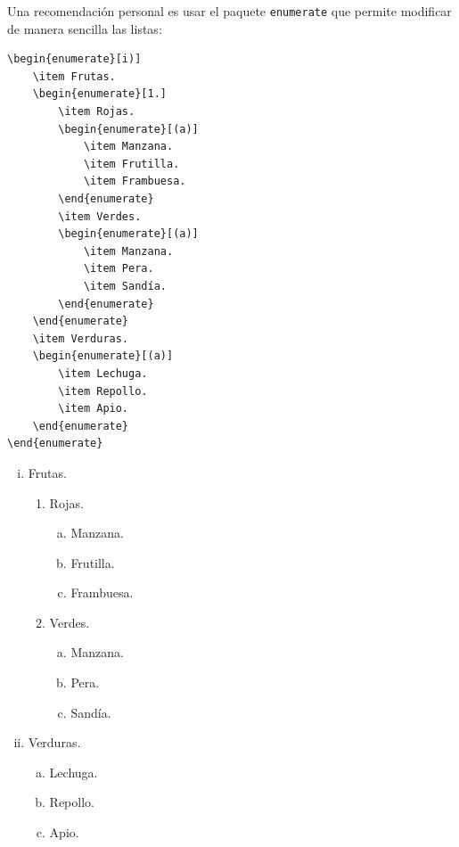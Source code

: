 Una recomendación personal es usar el paquete \texttt{enumerate} que permite modificar de manera sencilla las listas:
\begin{multicols}{2}
	\begin{lstlisting}[basicstyle=\footnotesize\ttfamily]
\begin{enumerate}[i)]
	\item Frutas.
	\begin{enumerate}[1.]
		\item Rojas.
		\begin{enumerate}[(a)]
			\item Manzana.
			\item Frutilla.
			\item Frambuesa.
		\end{enumerate}
		\item Verdes.
		\begin{enumerate}[(a)]
			\item Manzana.
			\item Pera.
			\item Sandía.
		\end{enumerate}
	\end{enumerate}
	\item Verduras.
	\begin{enumerate}[(a)]
		\item Lechuga.
		\item Repollo.
		\item Apio.
	\end{enumerate}
\end{enumerate}
	\end{lstlisting}

	\vfill\null
	\columnbreak

	\begin{enumerate}[i)]
		\item Frutas.
			\begin{enumerate}[1.]
				\item Rojas.
					\begin{enumerate}[(a)]
						\item Manzana.
						\item Frutilla.
						\item Frambuesa.
					\end{enumerate}
				\item Verdes.
					\begin{enumerate}[(a)]
						\item Manzana.
						\item Pera.
						\item Sandía.
					\end{enumerate}
			\end{enumerate}
		\item Verduras.
			\begin{enumerate}[(a)]
				\item Lechuga.
				\item Repollo.
				\item Apio.
			\end{enumerate}
	\end{enumerate}
\end{multicols}

